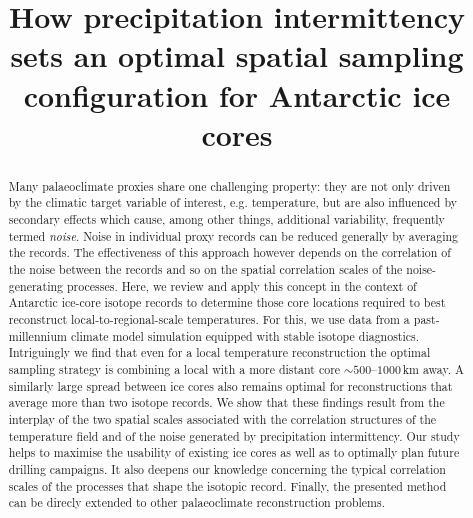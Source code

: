 \documentclass[cp, manuscript]{copernicus}
\begin{document}
\title{How precipitation intermittency sets an optimal spatial sampling
  configuration for Antarctic ice cores}




\received{}
\pubdiscuss{}
\revised{}
\accepted{}
\published{}


\maketitle

\begin{abstract} Many palaeoclimate proxies share one challenging property: they
are not only driven by the climatic target variable of interest,
e.g. temperature, but are also influenced by secondary effects which cause,
among other things, additional variability, frequently termed \emph{noise}.
Noise in individual proxy records can be reduced generally by averaging the
records. The effectiveness of this approach however depends on the correlation
of the noise between the records and so on the spatial correlation scales of the
noise-generating processes. Here, we review and apply this concept in the
context of Antarctic ice-core isotope records to determine those core locations
required to best reconstruct local-to-regional-scale temperatures. For this, we
use data from a past-millennium climate model simulation equipped with stable
isotope diagnostics. Intriguingly we find that even for a local temperature
reconstruction the optimal sampling strategy is combining a local with a more
distant core $\sim500$--$1000$\,km away. A similarly large spread between ice
cores also remains optimal for reconstructions that average more than two
isotope records. We show that these findings result from the interplay of the
two spatial scales associated with the correlation structures of the temperature
field and of the noise generated by precipitation intermittency. Our study helps
to maximise the usability of existing ice cores as well as to optimally plan
future drilling campaigns. It also deepens our knowledge concerning the typical
correlation scales of the processes that shape the isotopic record. Finally, the
presented method can be direcly extended to other palaeoclimate reconstruction
problems.
\end{abstract}
\end{document}
